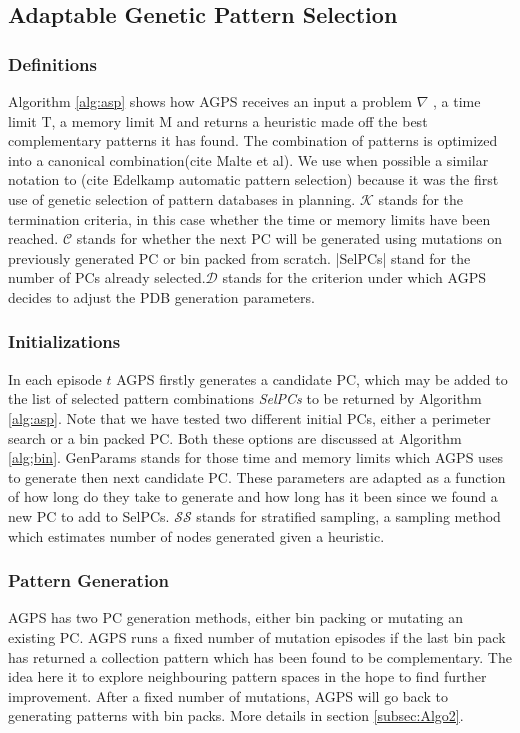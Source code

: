 \documentclass{article}
\newcommand{\mc}{\mathcal}
\begin{document}
\subsection{Adaptable Genetic Pattern Selection}
\subsubsection{Definitions}
Algorithm \ref{alg:asp} shows how AGPS receives an input a problem $\nabla$ , a time limit T, a memory limit M and returns a heuristic made off the best complementary patterns it has found.   The combination of patterns is optimized into a canonical combination(cite Malte et al).  We use when possible a similar notation to (cite Edelkamp automatic pattern selection) because it was the first use of genetic selection of pattern databases in planning.  $\mc{K}$ stands for the termination criteria, in this case whether the time or memory limits have been reached.  $\mc{C}$ stands for whether the next PC will be generated using mutations on previously generated PC or bin packed from scratch.  |SelPCs| stand for the number of PCs already selected.$\mc{D}$ stands for the criterion under which AGPS decides to adjust the PDB generation parameters.

\subsubsection{Initializations}
In each episode $t$ AGPS firstly generates a candidate PC, which may be added to the list of selected pattern combinations \emph{SelPCs} to be returned by Algorithm \ref{alg:asp}.  Note that we have tested two different initial PCs, either a perimeter search or a bin packed PC.  Both these options are discussed at Algorithm \ref{alg;bin}.  GenParams stands for those time and memory limits which AGPS uses to generate then next candidate PC.  These parameters are adapted as a function of how long do they take to generate and how long has it been since we found a new PC to add to SelPCs.  $\mc{SS}$ stands for stratified sampling, a sampling method which estimates number of nodes generated given a heuristic.

\subsubsection{Pattern Generation}

AGPS has two PC generation methods, either bin packing or mutating an existing PC.  AGPS runs a fixed number of mutation episodes if the last bin pack has returned a collection pattern which has been found to be complementary.  The idea here it to explore neighbouring pattern spaces in the hope to find further improvement.  After a fixed number of mutations, AGPS will go back to generating patterns with bin packs.  More details in section \ref{subsec:Algo2}.
\end{document}
